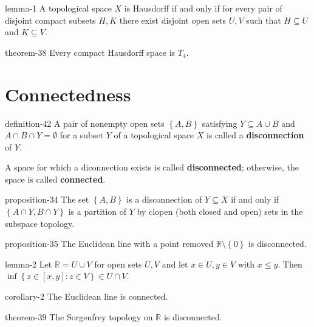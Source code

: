 \documentclass[10pt,]{article}
\newcommand{\terminology}[1]{\textbf{#1}}
\newcommand{\mb}{\mathbb}
\newcommand{\setBuilder}[2]{\left\{#1:#2\right\}}
\newcommand{\setList}[1]{\left\{#1\right\}}
\begin{document}
\begin{lemma}{}{}{lemma-1}%
\hypertarget{p-154}{}%
A topological space \(X\) is Hausdorff if and only if for every pair of disjoint compact subsets \(H,K\) there exist disjoint open sets \(U,V\) such that \(H\subseteq U\) and \(K\subseteq V\).%
\end{lemma}
\begin{theorem}{}{}{theorem-38}%
\hypertarget{p-155}{}%
Every compact Hausdorff space is \(T_4\).%
\end{theorem}
%
%
\typeout{************************************************}
\typeout{************************************************}
%
\section[{Connectedness}]{Connectedness}\label{section-connected}
\begin{definition}{}{definition-42}%
\hypertarget{p-156}{}%
A pair of nonempty open sets \(\setList{A,B}\) satisfying \(Y\subseteq A\cup B\) and \(A\cap B\cap Y=\emptyset\) for a subset \(Y\) of a topological space \(X\) is called a \terminology{disconnection} of \(Y\).%
\par
\hypertarget{p-157}{}%
A space for which a diconnection exists is called \terminology{disconnected}; otherwise, the space is called \terminology{connected}.%
\end{definition}
\begin{proposition}{}{}{proposition-34}%
\hypertarget{p-158}{}%
The set \(\setList{A,B}\) is a disconnection of \(Y\subseteq X\) if and only if \(\setList{A\cap Y,B\cap Y}\) is a partition of \(Y\) by clopen (both closed and open) sets in the subspace topology.%
\end{proposition}
\begin{proposition}{}{}{proposition-35}%
\hypertarget{p-159}{}%
The Euclidean line with a point removed \(\mb R\setminus\setList{0}\) is disconnected.%
\end{proposition}
\begin{lemma}{}{}{lemma-2}%
\hypertarget{p-160}{}%
Let \(\mb R=U\cup V\) for open sets \(U,V\) and let \(x\in U,y\in V\) with \(x\leq y\).  Then \(\inf\setBuilder{z\in[x,y]}{z\in V}\in U\cap V\).%
\end{lemma}
\begin{corollary}{}{}{corollary-2}%
\hypertarget{p-161}{}%
The Euclidean line is connected.%
\end{corollary}
\begin{theorem}{}{}{theorem-39}%
\hypertarget{p-162}{}%
The Sorgenfrey topology on \(\mb R\) is disconnected.%
\end{theorem}
\end{document}
